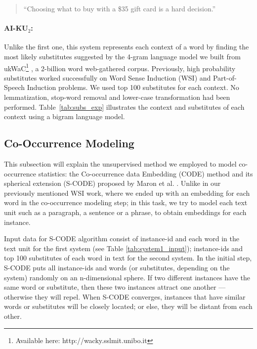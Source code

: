 \documentclass[11pt]{article}
\begin{document}
\begin{quote}
``Choosing what to buy with a \$35 gift card is a hard decision.''
\end{quote}



\paragraph{AI-KU$_2$:} Unlike the first one, this system represents each context of a word by finding the most likely substitutes suggested by the 4-gram language model we built from ukWaC\footnote{Available here: http://wacky.sslmit.unibo.it} \cite{ukWaC}, a 2-billion word web-gathered corpus. Previously, high probability substitutes worked successfully on Word Sense Induction (WSI) \cite{baskaya13ai} and Part-of-Speech Induction \cite{yatbaz2012learning} problems. We used top 100 substitutes for each context. No lemmatization, stop-word removal and lower-case transformation had been performed. Table~\ref{tab:subs_exp} illustrates the context and substitutes of each context using a bigram language model.



\subsection{Co-Occurrence Modeling}

This subsection will explain the unsupervised method we employed to model co-occurrence statistics: the Co-occurrence data Embedding (CODE) method \cite{globerson-CODE} and its spherical extension (S-CODE) proposed by Maron et al. . Unlike in our previously mentioned WSI work, where we ended up with an embedding for each
word in the co-occurrence modeling step; in this task, we try to model each text unit such as a paragraph, a sentence or a phrase, to obtain embeddings for each instance. 

Input data for S-CODE algorithm consist of instance-id and each word in the text unit for the first system (see Table \ref{tab:system1_input}); instance-ids and top 100 substitutes of each word in text for the second system. In the initial step, S-CODE puts all instance-ids and words (or substitutes, depending on the system) randomly on an n-dimensional sphere. If two different instances have the same word or substitute, then these two instances attract one another --- otherwise they will repel. When S-CODE converges, instances that have similar words or substitutes will be closely located; or else, they will be distant from each other. 
\end{document}
